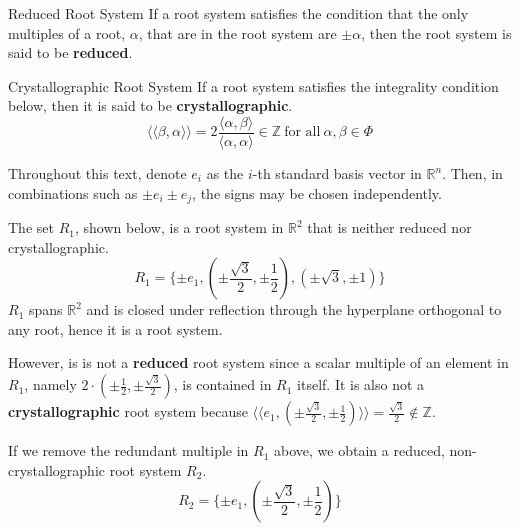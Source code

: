 \begin{nameddefinition}{Reduced Root System}
    If a root system satisfies the condition that the only multiples of a root, $\alpha$, that are in the root system
    are $\pm \alpha$, then the root system is said to be \textbf{reduced}.
\end{nameddefinition}

\begin{nameddefinition}{Crystallographic Root System}
    If a root system satisfies the integrality condition below, then it is said to be \textbf{crystallographic}.
    \begin{equation*}
        \langle \langle \beta, \alpha \rangle \rangle = 2 \frac{ \langle \alpha, \beta \rangle}{\langle \alpha, \alpha \rangle}
        \in \mathbb{Z} \ \text{for all} \ \alpha, \beta \in \Phi
    \end{equation*}
\end{nameddefinition}

Throughout this text, denote $e_i$ as the $i$-th standard basis vector in $\mathbb{R}^n$.
Then, in combinations such as $\pm e_i \pm e_j$, the signs may be chosen independently.

\begin{example}
    The set $R_1$, shown below, is a root system in $\mathbb{R}^2$ that is neither reduced nor crystallographic.
    \begin{equation*}
        R_1 = \{
            \pm e_1, (\pm \frac{\sqrt{3}}{2}, \pm \frac{1}{2}), (\pm \sqrt{3}, \pm 1) 
        \} 
    \end{equation*}
    $R_1$ spans $\mathbb{R}^2$ and is closed under reflection through the hyperplane orthogonal to any root,
    hence it is a root system.
    
    However, is is not a \textbf{reduced} root system since a scalar multiple of an element in $R_1$,
    namely $2 \cdot (\pm \frac{1}{2}, \pm \frac{\sqrt{3}}{2})$, is contained in $R_1$ itself. 
    It is also not a \textbf{crystallographic} root system because 
    $\langle \langle e_1, (\pm \frac{\sqrt{3}}{2}, \pm \frac{1}{2}) \rangle \rangle = \frac{\sqrt{3}}{2} \notin \mathbb{Z}$.
\end{example}

\begin{example}
    If we remove the redundant multiple in $R_1$ above, we obtain a reduced, non-crystallographic root system $R_2$.
    \begin{equation*}
        R_2 = \{
            \pm e_1, (\pm \frac{\sqrt{3}}{2}, \pm \frac{1}{2})
        \} 
    \end{equation*}
\end{example}

